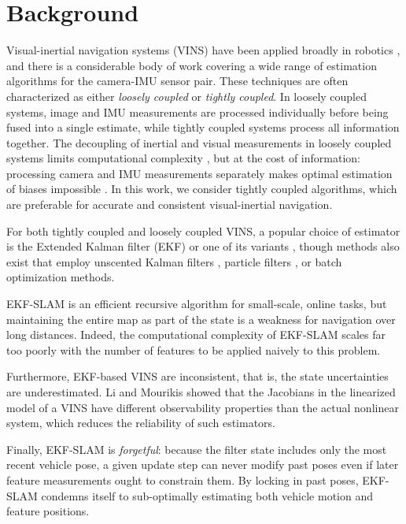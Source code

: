 \documentclass[letterpaper, 10 pt, conference]{ieeeconf}  %
\begin{document}
\section{Background} \label{sec:relatedwork}

Visual-inertial navigation systems (VINS) have been applied broadly in robotics \cite{Mourikis:2007:ICRA, Sibley:2010:JFR, Huster:2002:OC, Kottas:2013:IROS, Kim:2007:RSS, Li:2013coa,  You:2001:VR}, and there is a considerable body of work covering a wide range of estimation algorithms for the camera-IMU sensor pair. 
These techniques are often characterized as either \textit{loosely coupled} or \textit{tightly coupled}.
In loosely coupled systems, image and IMU measurements are processed individually before being fused into a single estimate, while tightly coupled systems process all information together.  
The decoupling of inertial and visual measurements in loosely coupled systems limits computational complexity \cite{Leutenegger:2015:IJRR}, but at the cost of information: processing camera and IMU measurements separately makes optimal estimation of biases impossible \cite{Li:2013coa}. 
In this work, we consider tightly coupled algorithms, which are preferable for accurate and consistent visual-inertial navigation. 

For both tightly coupled and loosely coupled VINS, a popular choice of estimator is the Extended Kalman filter (EKF) or one of its variants \cite{Huster:2002:OC, You:2001:VR, Kottas:2013:RSS, Kim:2007:RSS, Mourikis:2007:ICRA}, though methods also exist that employ unscented Kalman filters \cite{Ebcin:2007:ION}, particle filters \cite{Fox:1999:JAIR, Pupilli:2005:BMVC}, or batch optimization methods\cite{Triggs:2000va,Strelow:2004:IJR}. 

EKF-SLAM is an efficient recursive algorithm for small-scale, online tasks, but maintaining the entire map as part of the state is a weakness for navigation over long distances.
Indeed, the computational complexity of EKF-SLAM scales far too poorly with the number of features to be applied naively to this problem.

Furthermore, EKF-based VINS are inconsistent, that is, the state uncertainties are underestimated.
Li and Mourikis \cite{Li:2013coa} showed that the Jacobians in the linearized model of a VINS have different observability properties than the actual nonlinear system, which reduces the reliability of such estimators.

Finally, EKF-SLAM is \textit{forgetful}:
because the filter state includes only the most recent vehicle pose, a given update step can never modify past poses even if later feature measurements ought to constrain them.
By locking in past poses, EKF-SLAM condemns itself to sub-optimally estimating both vehicle motion and feature positions.
\end{document}
